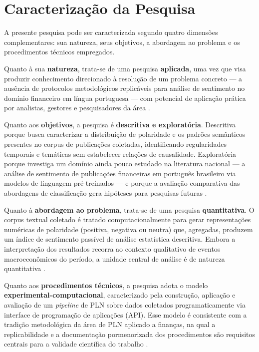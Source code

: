 
\section{Caracterização da Pesquisa} \label{sec:caracterizacao_pesquisa}

A presente pesquisa pode ser caracterizada segundo quatro dimensões complementares: sua natureza, seus objetivos, a abordagem ao problema e os procedimentos técnicos empregados.

Quanto à sua \textbf{natureza}, trata-se de uma pesquisa \textbf{aplicada}, uma vez que visa produzir conhecimento direcionado à resolução de um problema concreto — a ausência de protocolos metodológicos replicáveis para análise de sentimento no domínio financeiro em língua portuguesa — com potencial de aplicação prática por analistas, gestores e pesquisadores da área \cite{galdi2018}.

Quanto aos \textbf{objetivos}, a pesquisa é \textbf{descritiva e exploratória}. Descritiva porque busca caracterizar a distribuição de polaridade e os padrões semânticos presentes no corpus de publicações coletadas, identificando regularidades temporais e temáticas sem estabelecer relações de causalidade. Exploratória porque investiga um domínio ainda
pouco estudado na literatura nacional — a análise de sentimento de publicações financeiras em português brasileiro via modelos de linguagem pré-treinados — e porque a avaliação comparativa das abordagens de classificação gera hipóteses para pesquisas futuras \cite{santos2023finbert}.

Quanto à \textbf{abordagem ao problema}, trata-se de uma pesquisa \textbf{quantitativa}. O corpus textual coletado é tratado computacionalmente para gerar representações numéricas de polaridade (positiva, negativa ou neutra) que, agregadas, produzem um índice de sentimento passível de análise estatística descritiva. Embora a interpretação dos resultados recorra ao contexto qualitativo de eventos macroeconômicos do período, a unidade central de análise é de natureza quantitativa \cite{kearney2014}.

Quanto aos \textbf{procedimentos técnicos}, a pesquisa adota o modelo \textbf{experimental-computacional}, caracterizado pela construção, aplicação e avaliação de um \textit{pipeline} de PLN sobre dados coletados programaticamente via interface de programação de aplicações (API). Esse modelo é consistente com a tradição metodológica da área de PLN aplicado a finanças, na qual a replicabilidade e a documentação pormenorizada dos procedimentos são requisitos centrais para a validade científica do trabalho
.

